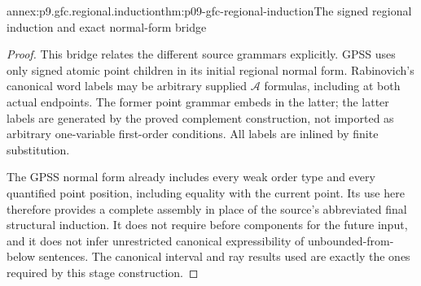 \begin{annexitem}{annex:p9.gfc.regional.induction}{thm:p09-gfc-regional-induction}{The signed regional induction and exact normal-form bridge}
\begin{proof}
This bridge relates
the different source
grammars explicitly.
GPSS uses only
signed atomic
point children
in its initial
regional normal
form. Rabinovich's
canonical word
labels may be
arbitrary supplied
\(\mathcal A\)
formulas, including
at both actual
endpoints. The
former point
grammar embeds
in the latter;
the latter labels
are generated
by the proved
complement
construction,
not imported
as arbitrary
one-variable
first-order
conditions.
All labels
are inlined
by finite
substitution.

The GPSS normal
form already
includes every
weak order type
and every quantified
point position,
including equality
with the current
point. Its use
here therefore
provides a complete
assembly in place
of the source's
abbreviated final
structural induction.
It does not require
before components
for the future
input, and it does
not infer unrestricted
canonical expressibility
of unbounded-from-below
sentences. The
canonical interval
and ray results
used are exactly
the ones required
by this stage
construction.
\end{proof}
\end{annexitem}

